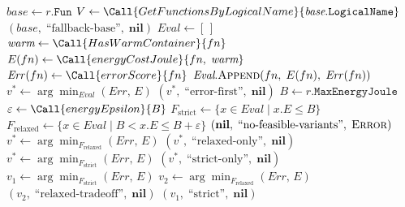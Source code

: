 \begin{algorithm}[H]
\caption{\texttt{SelectEnergyAwareVariant}: politica a casi}
\label{alg:select}
\begin{algorithmic}[1]
    \State $\textit{base} \gets r.\texttt{Fun}$
    \State $V \gets \Call{GetFunctionsByLogicalName}{\textit{base}.\texttt{LogicalName}}$
        \State \Return $(\textit{base},\; \text{``fallback-base''},\; \textbf{nil})$
    \EndIf
    \State $\textit{Eval} \gets [\,]$
        \State $\textit{warm} \gets \Call{HasWarmContainer}{fn}$
        \State $E(fn) \gets \Call{energyCostJoule}{fn,\; \textit{warm}}$
        \State $\mathit{Err}(fn) \gets \Call{errorScore}{fn}$
        \State $\textit{Eval}.\textsc{Append}(fn,\; E(fn),\; \mathit{Err}(fn))$
    \EndFor
        \State $v^* \gets \arg\min_{\textit{Eval}} (\mathit{Err},\, E)$
        \State \Return $(v^*,\; \text{``error-first''},\; \textbf{nil})$
    \EndIf
    \State $B \gets r.\texttt{MaxEnergyJoule}$
    \State $\varepsilon \gets \Call{energyEpsilon}{B}$
    \State $F_{\text{strict}}   \gets \{x \in \textit{Eval} \mid x.E \leq B\}$
    \State $F_{\text{relaxed}} \gets \{x \in \textit{Eval} \mid B < x.E \leq B + \varepsilon\}$
        \State \Return $(\textbf{nil},\; \text{``no-feasible-variants''},\; \textsc{Error})$
    \EndIf
        \State $v^* \gets \arg\min_{F_{\text{relaxed}}} (\mathit{Err},\, E)$
        \State \Return $(v^*,\; \text{``relaxed-only''},\; \textbf{nil})$
    \EndIf
        \State $v^* \gets \arg\min_{F_{\text{strict}}} (\mathit{Err},\, E)$
        \State \Return $(v^*,\; \text{``strict-only''},\; \textbf{nil})$
    \EndIf
    \State $v_1 \gets \arg\min_{F_{\text{strict}}} (\mathit{Err},\, E)$
    \State $v_2 \gets \arg\min_{F_{\text{relaxed}}} (\mathit{Err},\, E)$
        \State \Return $(v_2,\; \text{``relaxed-tradeoff''},\; \textbf{nil})$
    \Else
        \State \Return $(v_1,\; \text{``strict''},\; \textbf{nil})$
    \EndIf
\EndFunction
\end{algorithmic}
\end{algorithm}

